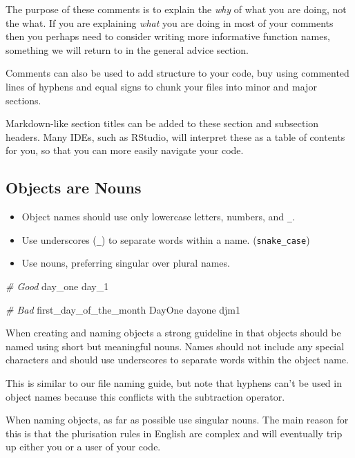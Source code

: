 \documentclass[
  12pt,
]{book}
\newenvironment{Shaded}{\begin{snugshade}}{\end{snugshade}}
\newcommand{\CommentTok}[1]{\textcolor[rgb]{0.56,0.35,0.01}{\textit{#1}}}
\newcommand{\NormalTok}[1]{#1}
\begin{document}
The purpose of these comments is to explain the \emph{why} of what you are doing, not the what. If you are explaining \emph{what} you are doing in most of your comments then you perhaps need to consider writing more informative function names, something we will return to in the general advice section.

Comments can also be used to add structure to your code, buy using commented lines of hyphens and equal signs to chunk your files into minor and major sections.

Markdown-like section titles can be added to these section and subsection headers. Many IDEs, such as RStudio, will interpret these as a table of contents for you, so that you can more easily navigate your code.

\hypertarget{objects-are-nouns}{%
\subsection{Objects are Nouns}\label{objects-are-nouns}}

\begin{itemize}
\item
  Object names should use only lowercase letters, numbers, and \texttt{\_}.
\item
  Use underscores (\texttt{\_}) to separate words within a name. (\texttt{snake\_case})
\item
  Use nouns, preferring singular over plural names.
\end{itemize}

\begin{Shaded}
\begin{Highlighting}[]
\CommentTok{\# Good}
\NormalTok{day\_one}
\NormalTok{day\_1}

\CommentTok{\# Bad}
\NormalTok{first\_day\_of\_the\_month}
\NormalTok{DayOne}
\NormalTok{dayone}
\NormalTok{djm1}
\end{Highlighting}
\end{Shaded}

When creating and naming objects a strong guideline in that objects should be named using short but meaningful nouns. Names should not include any special characters and should use underscores to separate words within the object name.

This is similar to our file naming guide, but note that hyphens can't be used in object names because this conflicts with the subtraction operator.

When naming objects, as far as possible use singular nouns. The main reason for this is that the plurisation rules in English are complex and will eventually trip up either you or a user of your code.
\end{document}
